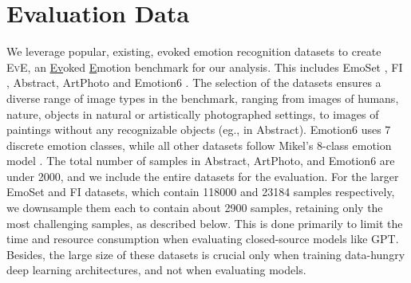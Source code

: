 \section{Evaluation Data}
\label{sec:benchmark}

We leverage popular, existing, evoked emotion recognition datasets to create \textsc{EvE}, an \underline{Ev}oked \underline{E}motion benchmark for our analysis. This includes EmoSet \cite{yang2023emoset}, FI \cite{you2016building}, Abstract, ArtPhoto \cite{machajdik2010affective} and Emotion6 \cite{peng2015mixed}. The selection of the datasets ensures a diverse range of image types in the benchmark, ranging from images of humans, nature, objects in natural or artistically photographed settings, to images of paintings without any recognizable objects (eg., in Abstract). Emotion6 uses 7 discrete emotion classes, while all other datasets follow Mikel's 8-class emotion model \cite{mikels2005emotional}. The total number of samples in Abstract, ArtPhoto, and Emotion6 are under 2000, and we include the entire datasets for the evaluation. For the larger EmoSet and FI datasets, which contain 118000 and 23184 samples respectively, we downsample them each to contain about 2900 samples, retaining only the most challenging samples, as described below. This is done primarily to limit the time and resource consumption when evaluating closed-source models like GPT. Besides, the large size of these datasets is crucial only when training data-hungry deep learning architectures, and not when evaluating models. 


